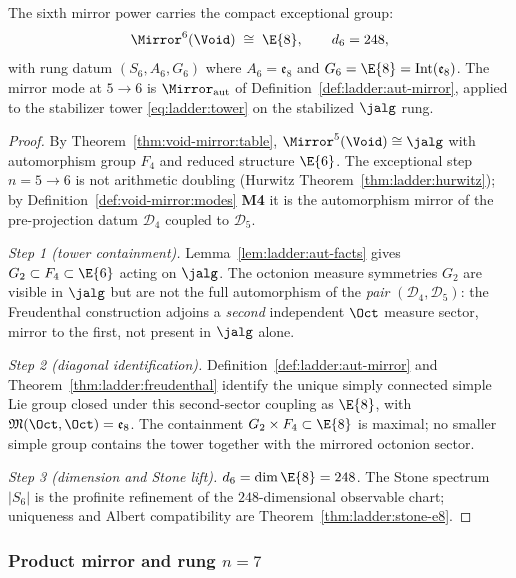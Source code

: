\begin{theorem}[Exceptional rung $n=6$]\label{thm:ladder:e8}
The sixth mirror power carries the compact exceptional group:
\begin{equation}\label{eq:ladder:mirror6}
  \Mirror^6(\Void)\;\cong\;\E{8},
  \qquad d_6=248,
\end{equation}
with rung datum $(S_6,A_6,G_6)$ where $A_6=\mathfrak{e}_8$ and
$G_6=\E{8}=\mathrm{Int}(\mathfrak{e}_8)$. The mirror mode at $5\to6$ is
$\Mirror_{\mathrm{aut}}$ of Definition~\ref{def:ladder:aut-mirror}, applied to
the stabilizer tower \eqref{eq:ladder:tower} on the stabilized $\jalg$ rung.
\end{theorem}

\begin{proof}
By Theorem~\ref{thm:void-mirror:table}, $\Mirror^5(\Void)\cong\jalg$ with
automorphism group $F_4$ and reduced structure $\E{6}$. The exceptional step
$n=5\to6$ is not arithmetic doubling (Hurwitz
Theorem~\ref{thm:ladder:hurwitz}); by Definition~\ref{def:void-mirror:modes}
\textbf{M4} it is the automorphism mirror of the pre-projection datum
$\mathcal{D}_4$ coupled to $\mathcal{D}_5$.

\emph{Step 1 (tower containment).}
Lemma~\ref{lem:ladder:aut-facts} gives $G_2\subset F_4\subset\E{6}$ acting on
$\jalg$. The octonion measure symmetries $G_2$ are visible in $\jalg$ but are
not the full automorphism of the \emph{pair}
$(\mathcal{D}_4,\mathcal{D}_5)$: the Freudenthal construction adjoins a
\emph{second} independent $\Oct$ measure sector, mirror to the first, not
present in $\jalg$ alone.

\emph{Step 2 (diagonal identification).}
Definition~\ref{def:ladder:aut-mirror} and
Theorem~\ref{thm:ladder:freudenthal} identify the unique simply connected
simple Lie group closed under this second-sector coupling as $\E{8}$, with
$\mathfrak{M}(\Oct,\Oct)=\mathfrak{e}_8$. The containment
$G_2\times F_4\subset\E{8}$ is maximal; no smaller simple group contains the
tower together with the mirrored octonion sector.

\emph{Step 3 (dimension and Stone lift).}
$d_6=\dim\E{8}=248$. The Stone spectrum $|S_6|$ is the profinite refinement
of the $248$-dimensional observable chart; uniqueness and Albert compatibility
are Theorem~\ref{thm:ladder:stone-e8}.
\end{proof}

\subsubsection{Product mirror and rung $n=7$}
\label{sec:ladder:mirror-e8e8}

